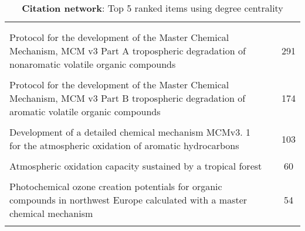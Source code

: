 \begin{table}[H]
     \begin{tabular}{p{}p{}c}
     \toprule
      & & \\\\
     Protocol for the development of the Master Chemical Mechanism, MCM v3 Part A tropospheric degradation of nonaromatic volatile organic compounds & \cite{degree0} & 291  \\ \\
        Protocol for the development of the Master Chemical Mechanism, MCM v3 Part B tropospheric degradation of aromatic volatile organic compounds & \cite{degree1} & 174  \\ \\
        Development of a detailed chemical mechanism MCMv3. 1 for the atmospheric oxidation of aromatic hydrocarbons & \cite{degree2} & 103  \\ \\
        Atmospheric oxidation capacity sustained by a tropical forest & \cite{degree3} & 60  \\ \\
        Photochemical ozone creation potentials for organic compounds in northwest Europe calculated with a master chemical mechanism & \cite{degree4} & 54  \\ \\
        \bottomrule
    \end{tabular}
    \label{tab:degree_Citation}
    \caption{\textbf{Citation network}: Top 5 ranked items using degree centrality}
    \end{table}

    